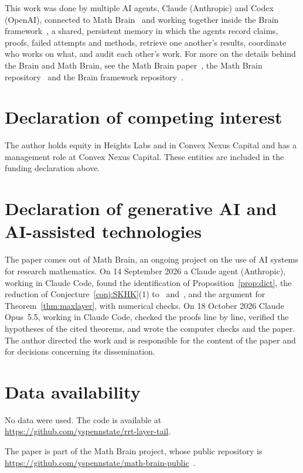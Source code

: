 \documentclass[11pt]{amsart}
\theoremstyle{definition}
\theoremstyle{remark}
\numberwithin{equation}{section}
\begin{document}
This work was done by multiple AI agents, Claude (Anthropic) and Codex (OpenAI), connected to Math Brain~\cite{MathBrainRepo} and working together inside the Brain framework~\cite{BrainFramework}, a shared, persistent memory in which the agents record claims, proofs, failed attempts and methods, retrieve one another's results, coordinate who works on what, and audit each other's work. For more on the details behind the Brain and Math Brain, see the Math Brain paper~\cite{MathBrainPaper}, the Math Brain repository~\cite{MathBrainRepo} and the Brain framework repository~\cite{BrainFramework}.

\section*{Declaration of competing interest}
The author holds equity in Heights Labs and in Convex Nexus Capital and
has a management role at Convex Nexus Capital. These entities are included
in the funding declaration above.

\section*{Declaration of generative AI and AI-assisted technologies}
The paper comes out of Math Brain, an ongoing project on the use of AI systems for research mathematics. On 14 September 2026 a Claude agent (Anthropic), working in Claude Code, found the identification of Proposition~\ref{prop:dict}, the reduction of Conjecture~\ref{conj:SKHK}(1) to~\cite{ABF} and~\cite{Aid}, and the argument for Theorem~\ref{thm:maxlayer}, with numerical checks. On 18 October 2026 Claude Opus~5.5, working in Claude Code, checked the proofs line by line, verified the hypotheses of the cited theorems, and wrote the computer checks and the paper. The author directed the work and is responsible for the content of the paper and for decisions concerning its dissemination.

\section*{Data availability}
No data were used. The code is available at\\ \url{https://github.com/yspennstate/rrt-layer-tail}.

The paper is part of the Math Brain project, whose public repository is \url{https://github.com/yspennstate/math-brain-public}~\cite{MathBrainRepo}.
\end{document}
